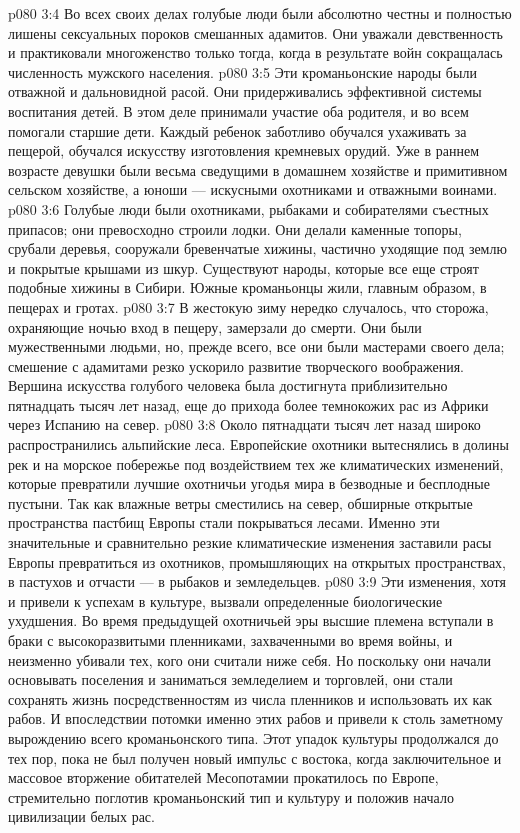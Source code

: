 \vs p080 3:4 Во всех своих делах голубые люди были абсолютно честны и полностью лишены сексуальных пороков смешанных адамитов. Они уважали девственность и практиковали многоженство только тогда, когда в результате войн сокращалась численность мужского населения.
\vs p080 3:5 Эти кроманьонские народы были отважной и дальновидной расой. Они придерживались эффективной системы воспитания детей. В этом деле принимали участие оба родителя, и во всем помогали старшие дети. Каждый ребенок заботливо обучался ухаживать за пещерой, обучался искусству изготовления кремневых орудий. Уже в раннем возрасте девушки были весьма сведущими в домашнем хозяйстве и примитивном сельском хозяйстве, а юноши --- искусными охотниками и отважными воинами.
\vs p080 3:6 Голубые люди были охотниками, рыбаками и собирателями съестных припасов; они превосходно строили лодки. Они делали каменные топоры, срубали деревья, сооружали бревенчатые хижины, частично уходящие под землю и покрытые крышами из шкур. Существуют народы, которые все еще строят подобные хижины в Сибири. Южные кроманьонцы жили, главным образом, в пещерах и гротах.
\vs p080 3:7 В жестокую зиму нередко случалось, что сторожа, охраняющие ночью вход в пещеру, замерзали до смерти. Они были мужественными людьми, но, прежде всего, все они были мастерами своего дела; смешение с адамитами резко ускорило развитие творческого воображения. Вершина искусства голубого человека была достигнута приблизительно пятнадцать тысяч лет назад, еще до прихода более темнокожих рас из Африки через Испанию на север.
\vs p080 3:8 \pc Около пятнадцати тысяч лет назад широко распространились альпийские леса. Европейские охотники вытеснялись в долины рек и на морское побережье под воздействием тех же климатических изменений, которые превратили лучшие охотничьи угодья мира в безводные и бесплодные пустыни. Так как влажные ветры сместились на север, обширные открытые пространства пастбищ Европы стали покрываться лесами. Именно эти значительные и сравнительно резкие климатические изменения заставили расы Европы превратиться из охотников, промышляющих на открытых пространствах, в пастухов и отчасти --- в рыбаков и земледельцев.
\vs p080 3:9 Эти изменения, хотя и привели к успехам в культуре, вызвали определенные биологические ухудшения. Во время предыдущей охотничьей эры высшие племена вступали в браки с высокоразвитыми пленниками, захваченными во время войны, и неизменно убивали тех, кого они считали ниже себя. Но поскольку они начали основывать поселения и заниматься земледелием и торговлей, они стали сохранять жизнь посредственностям из числа пленников и использовать их как рабов. И впоследствии потомки именно этих рабов и привели к столь заметному вырождению всего кроманьонского типа. Этот упадок культуры продолжался до тех пор, пока не был получен новый импульс с востока, когда заключительное и массовое вторжение обитателей Месопотамии прокатилось по Европе, стремительно поглотив кроманьонский тип и культуру и положив начало цивилизации белых рас.
